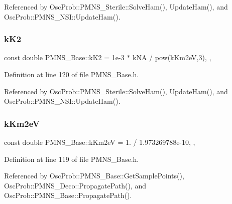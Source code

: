 Referenced by Osc\+Prob\+::\+P\+M\+N\+S\+\_\+\+Sterile\+::\+Solve\+Ham(), Update\+Ham(), and Osc\+Prob\+::\+P\+M\+N\+S\+\_\+\+N\+S\+I\+::\+Update\+Ham().

\mbox{\label{classOscProb_1_1PMNS__Base_a326fc5016d7dd7ce05682c06cdcb6d94}} 
\subsubsection{\texorpdfstring{k\+K2}{kK2}}
{\footnotesize\ttfamily const double P\+M\+N\+S\+\_\+\+Base\+::k\+K2 = 1e-\/3 $\ast$ k\+N\+A / pow(k\+Km2e\+V,3)\hspace{0.3cm}{\ttfamily [static]}, {\ttfamily [protected]}, {\ttfamily [inherited]}}



Definition at line 120 of file P\+M\+N\+S\+\_\+\+Base.\+h.



Referenced by Osc\+Prob\+::\+P\+M\+N\+S\+\_\+\+Sterile\+::\+Solve\+Ham(), Update\+Ham(), and Osc\+Prob\+::\+P\+M\+N\+S\+\_\+\+N\+S\+I\+::\+Update\+Ham().

\mbox{\label{classOscProb_1_1PMNS__Base_a382ddd7b76ca89b43f22614a2ea7327b}} 
\subsubsection{\texorpdfstring{k\+Km2eV}{kKm2eV}}
{\footnotesize\ttfamily const double P\+M\+N\+S\+\_\+\+Base\+::k\+Km2eV = 1. / 1.\+973269788e-\/10\hspace{0.3cm}{\ttfamily [static]}, {\ttfamily [protected]}, {\ttfamily [inherited]}}



Definition at line 119 of file P\+M\+N\+S\+\_\+\+Base.\+h.



Referenced by Osc\+Prob\+::\+P\+M\+N\+S\+\_\+\+Base\+::\+Get\+Sample\+Points(), Osc\+Prob\+::\+P\+M\+N\+S\+\_\+\+Deco\+::\+Propagate\+Path(), and Osc\+Prob\+::\+P\+M\+N\+S\+\_\+\+Base\+::\+Propagate\+Path().


